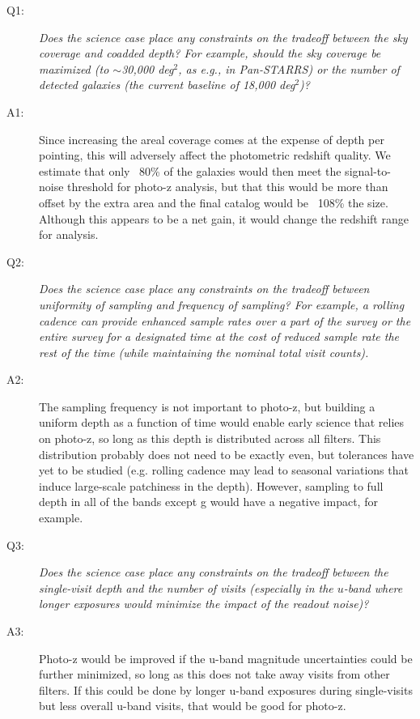  \begin{description}

 \item[Q1:] {\it Does the science case place any constraints on the
 tradeoff between the sky coverage and coadded depth? For example, should
 the sky coverage be maximized (to $\sim$30,000 deg$^2$, as e.g., in
 Pan-STARRS) or the number of detected galaxies (the current baseline 
 of 18,000 deg$^2$)?}

 \item[A1:] Since increasing the areal coverage comes at the expense of depth per pointing, this will adversely affect the photometric redshift quality. We estimate that only ~80\% of the galaxies would then meet the signal-to-noise threshold for photo-z analysis, but that this would be more than offset by the extra area and the final catalog would be ~108\% the size. Although this appears to be a net gain, it would change the redshift range for analysis.

 \item[Q2:] {\it Does the science case place any constraints on the
 tradeoff between uniformity of sampling and frequency of  sampling? For
 example, a rolling cadence can provide enhanced sample rates over a part
 of the survey or the entire survey for a designated time at the cost of
 reduced sample rate the rest of the time (while maintaining the nominal
 total visit counts).}

 \item[A2:] The sampling frequency is not important to photo-z, but building a uniform depth as a function of time would enable early science that relies on photo-z, so long as this depth is distributed across all filters. This distribution probably does not need to be exactly even, but tolerances have yet to be studied (e.g. rolling cadence may lead to seasonal variations that induce large-scale patchiness in the depth). However, sampling to full depth in all of the bands except g would have a negative impact, for example.

 \item[Q3:] {\it Does the science case place any constraints on the
 tradeoff between the single-visit depth and the number of visits
 (especially in the $u$-band where longer exposures would minimize the
 impact of the readout noise)?}

 \item[A3:] Photo-z would be improved if the u-band magnitude uncertainties could be further minimized, so long as this does not take away visits from other filters. If this could be done by longer u-band exposures during single-visits but less overall u-band visits, that would be good for photo-z.


\end{description}
